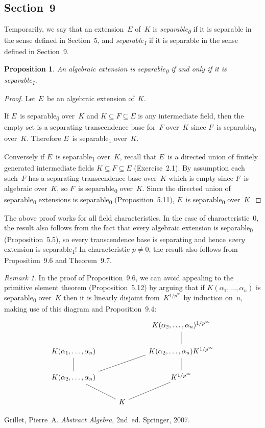 \documentclass[letterpaper,12pt]{article}
\newcommand{\sub}{\textsubscript}
\theoremstyle{definition}
\theoremstyle{remark}
\newtheorem*{rmk}{Remark}
\theoremstyle{plain}
\newtheorem*{prop}{Proposition}
\begin{document}
\subsection*{Section~9}
Temporarily, we say that an extension~\(E\) of~\(K\) is \emph{separable\sub{0}} if it is separable in the sense defined in Section~5, and \emph{separable\sub{1}} if it is separable in the sense defined in Section~9.

\begin{prop}
An algebraic extension is separable\sub{0} if and only if it is separable\sub{1}.
\end{prop}
\begin{proof}
Let \(E\)~be an algebraic extension of~\(K\).

If \(E\)~is separable\sub{0} over~\(K\) and \(K\subseteq F\subseteq E\) is any intermediate field, then the empty set is a separating transcendence base for~\(F\) over~\(K\) since \(F\)~is separable\sub{0} over~\(K\). Therefore \(E\)~is separable\sub{1} over~\(K\).

Conversely if \(E\)~is separable\sub{1} over~\(K\), recall that \(E\)~is a directed union of finitely generated intermediate fields \(K\subseteq F\subseteq E\) (Exercise~2.1). By assumption each such~\(F\) has a separating transcendence base over~\(K\) which is empty since \(F\)~is algebraic over~\(K\), so \(F\)~is separable\sub{0} over~\(K\). Since the directed union of separable\sub{0} extensions is separable\sub{0} (Proposition~5.11), \(E\)~is separable\sub{0} over~\(K\).
\end{proof}
\noindent The above proof works for all field characteristics. In the case of characteristic~\(0\), the result also follows from the fact that every algebraic extension is separable\sub{0} (Proposition~5.5), so every transcendence base is separating and hence \emph{every} extension is separable\sub{1}! In characteristic \(p\ne 0\), the result also follows from Proposition~9.6 and Theorem~9.7.

\begin{rmk}
In the proof of Proposition~9.6, we can avoid appealing to the primitive element theorem (Proposition~5.12) by arguing that if \(K(\alpha_1,\ldots,\alpha_n)\) is separable\sub{0} over~\(K\) then it is linearly disjoint from~\(K^{1/p^{\infty}}\) by induction on~\(n\), making use of this diagram and Proposition~9.4:
\[\begin{tikzcd}
							&	&K(\alpha_2,\ldots,\alpha_n)^{1/p^{\infty}}\\
K(\alpha_1,\ldots,\alpha_n)	&	&K(\alpha_2,\ldots,\alpha_n)K^{1/p^{\infty}}\\
K(\alpha_2,\ldots,\alpha_n)	&	&K^{1/p^{\infty}}\\
							&K
\arrow[no head, from=2-3, to=1-3]
\arrow[no head, from=3-1, to=2-1]
\arrow[no head, from=3-1, to=2-3, start anchor=north east, end anchor={[yshift=4pt]south west}]
\arrow[no head, from=3-3, to=2-3]
\arrow[no head, from=4-2, to=3-1]
\arrow[no head, from=4-2, to=3-3]
\end{tikzcd}\]
\end{rmk}

\begin{thebibliography}{0}
 Grillet, Pierre~A. \textit{Abstract Algebra}, 2nd~ed. Springer, 2007.
\end{thebibliography}
\end{document}
